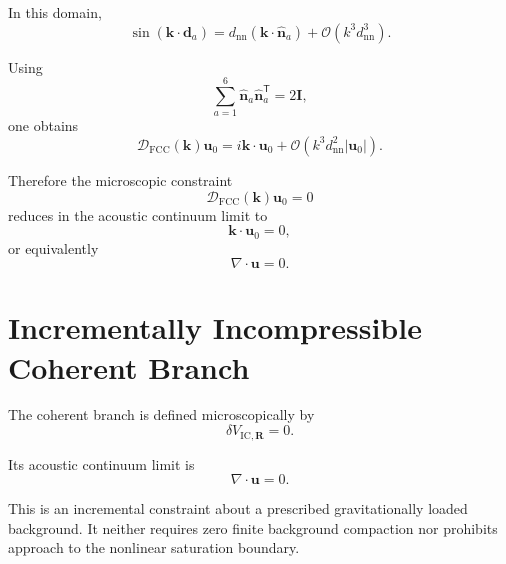 In this domain,
\begin{equation}
    \sin
    \left(
        \mathbf{k}\cdot\mathbf{d}_a
    \right)
    =
    d_{\mathrm{nn}}
    \left(
        \mathbf{k}\cdot\hat{\mathbf{n}}_a
    \right)
    +
    \mathcal{O}
    \left(
        k^3d_{\mathrm{nn}}^3
    \right).
\end{equation}

Using
\begin{equation}
    \sum_{a=1}^{6}
    \hat{\mathbf{n}}_a
    \hat{\mathbf{n}}_a^{\mathsf{T}}
    =
    2\mathbf{I},
\end{equation}
one obtains
\begin{equation}
    \boxed{
    \mathcal{D}_{\mathrm{FCC}}(\mathbf{k})
    \mathbf{u}_0
    =
    i\mathbf{k}\cdot\mathbf{u}_0
    +
    \mathcal{O}
    \left(
        k^3d_{\mathrm{nn}}^2
        |\mathbf{u}_0|
    \right).
    }
\end{equation}

Therefore the microscopic constraint
\begin{equation}
    \mathcal{D}_{\mathrm{FCC}}(\mathbf{k})
    \mathbf{u}_0
    =
    0
\end{equation}
reduces in the acoustic continuum limit to
\begin{equation}
    \mathbf{k}\cdot\mathbf{u}_0
    =
    0,
\end{equation}
or equivalently
\begin{equation}
    \nabla\cdot\mathbf{u}
    =
    0.
\end{equation}


\section{Incrementally Incompressible Coherent Branch}
\label{sec:AP_incompressible_branch}

The coherent branch is defined microscopically by
\begin{equation}
    \delta V_{\mathrm{IC},\mathbf{R}}
    =
    0.
\end{equation}

Its acoustic continuum limit is
\begin{equation}
    \nabla\cdot\mathbf{u}
    =
    0.
\end{equation}

This is an incremental constraint about a prescribed gravitationally loaded background. It neither requires zero finite background compaction nor prohibits approach to the nonlinear saturation boundary.

